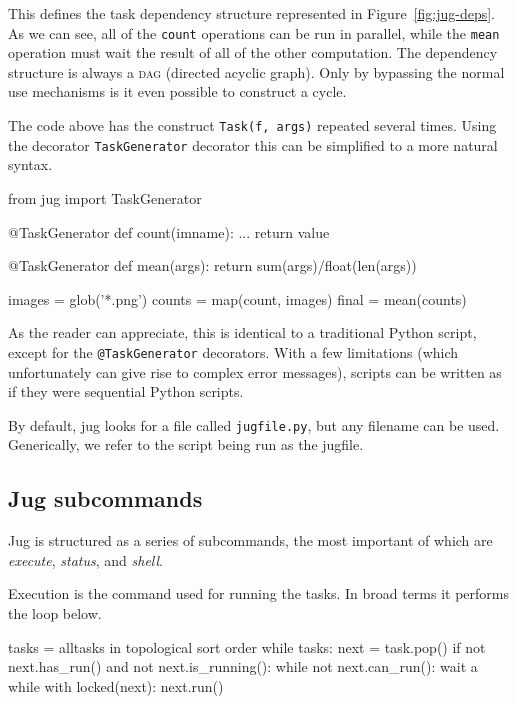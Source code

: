 \documentclass{article}
\let\code\texttt
\begin{document}
This defines the task dependency structure represented in
Figure~\ref{fig:jug-deps}. As we can see, all of the \code{count} operations
can be run in parallel, while the \code{mean} operation must wait the result of
all of the other computation. The dependency structure is always a \textsc{dag}
(directed acyclic graph). Only by bypassing the normal use mechanisms is it
even possible to construct a cycle.

The code above has the construct \code{Task(f, args)} repeated several times.
Using the decorator \code{TaskGenerator} decorator this can be simplified to a
more natural syntax.

\begin{python}
from jug import TaskGenerator

@TaskGenerator
def count(imname):
    ...
    return value

@TaskGenerator
def mean(args):
    return sum(args)/float(len(args))

images = glob('*.png')
counts = map(count, images)
final = mean(counts)
\end{python}

As the reader can appreciate, this is identical to a traditional Python script,
except for the \code{@TaskGenerator} decorators. With a few limitations (which
unfortunately can give rise to complex error messages), scripts can be written
as if they were sequential Python scripts.

By default, jug looks for a file called \code{jugfile.py}, but any filename can
be used. Generically, we refer to the script being run as the jugfile.

\subsection{Jug subcommands}

Jug is structured as a series of subcommands, the most important of which are
\emph{execute}, \emph{status}, and \emph{shell}.

Execution is the command used for running the tasks. In broad terms it performs
the loop below.

\begin{python}
tasks = alltasks in topological sort order
while tasks:
    next = task.pop()
    if not next.has_run() and not next.is_running():
        while not next.can_run():
            wait a while
        with locked(next):
            next.run()
\end{python}
\end{document}
